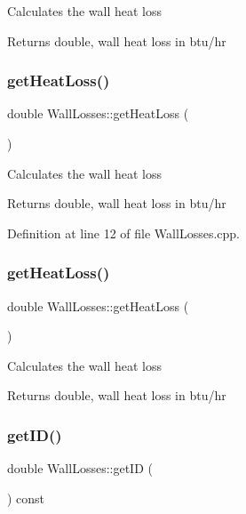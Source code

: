 Calculates the wall heat loss \begin{DoxyReturn}{Returns}
double, wall heat loss in btu/hr 
\end{DoxyReturn}
\mbox{\label{class_wall_losses_a884da3507498878f619cbe5ba340c0ef}} 
\subsubsection{\texorpdfstring{get\+Heat\+Loss()}{getHeatLoss()}\hspace{0.1cm}{\footnotesize\ttfamily [2/3]}}
{\footnotesize\ttfamily double Wall\+Losses\+::get\+Heat\+Loss (\begin{DoxyParamCaption}{ }\end{DoxyParamCaption})}

Calculates the wall heat loss \begin{DoxyReturn}{Returns}
double, wall heat loss in btu/hr 
\end{DoxyReturn}


Definition at line 12 of file Wall\+Losses.\+cpp.

\mbox{\label{class_wall_losses_a884da3507498878f619cbe5ba340c0ef}} 
\subsubsection{\texorpdfstring{get\+Heat\+Loss()}{getHeatLoss()}\hspace{0.1cm}{\footnotesize\ttfamily [3/3]}}
{\footnotesize\ttfamily double Wall\+Losses\+::get\+Heat\+Loss (\begin{DoxyParamCaption}{ }\end{DoxyParamCaption})}

Calculates the wall heat loss \begin{DoxyReturn}{Returns}
double, wall heat loss in btu/hr 
\end{DoxyReturn}
\mbox{\label{class_wall_losses_ad67b46094ba89cb759ec124c63c137de}} 
\subsubsection{\texorpdfstring{get\+I\+D()}{getID()}\hspace{0.1cm}{\footnotesize\ttfamily [1/3]}}
{\footnotesize\ttfamily double Wall\+Losses\+::get\+ID (\begin{DoxyParamCaption}{ }\end{DoxyParamCaption}) const\hspace{0.3cm}{\ttfamily [inline]}}

